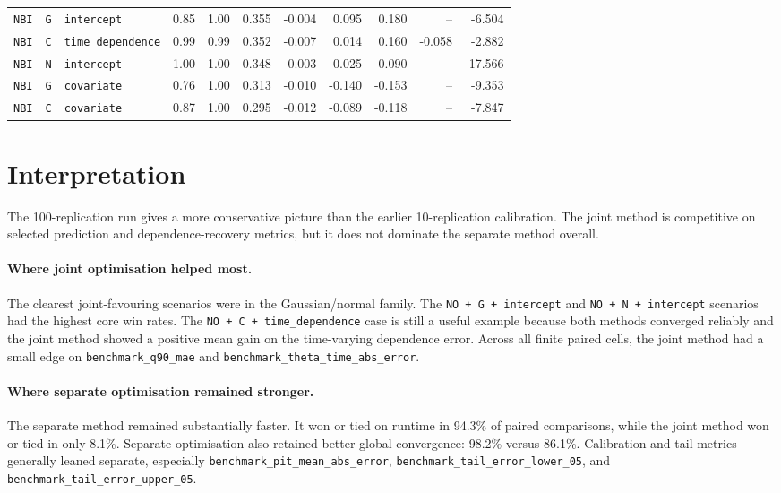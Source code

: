 \documentclass[11pt]{article}
\begin{document}
\begin{landscape}
\begin{longtable}{lllrrrrrrrr}
\texttt{NBI} & \texttt{G} & \texttt{intercept} & 0.85 & 1.00 & 0.355 & -0.004 & 0.095 & 0.180 & -- & -6.504 \\
\texttt{NBI} & \texttt{C} & \texttt{time\_dependence} & 0.99 & 0.99 & 0.352 & -0.007 & 0.014 & 0.160 & -0.058 & -2.882 \\
\texttt{NBI} & \texttt{N} & \texttt{intercept} & 1.00 & 1.00 & 0.348 & 0.003 & 0.025 & 0.090 & -- & -17.566 \\
\texttt{NBI} & \texttt{G} & \texttt{covariate} & 0.76 & 1.00 & 0.313 & -0.010 & -0.140 & -0.153 & -- & -9.353 \\
\texttt{NBI} & \texttt{C} & \texttt{covariate} & 0.87 & 1.00 & 0.295 & -0.012 & -0.089 & -0.118 & -- & -7.847 \\
\bottomrule
\end{longtable}
\end{landscape}

\section{Interpretation}

The 100-replication run gives a more conservative picture than the earlier
10-replication calibration.  The joint method is competitive on selected
prediction and dependence-recovery metrics, but it does not dominate the
separate method overall.

\paragraph{Where joint optimisation helped most.}
The clearest joint-favouring scenarios were in the Gaussian/normal family.  The
\texttt{NO + G + intercept} and \texttt{NO + N + intercept} scenarios had the
highest core win rates.  The \texttt{NO + C + time\_dependence} case is still a
useful example because both methods converged reliably and the joint method
showed a positive mean gain on the time-varying dependence error.  Across all
finite paired cells, the joint method had a small edge on
\texttt{benchmark\_q90\_mae} and \texttt{benchmark\_theta\_time\_abs\_error}.

\paragraph{Where separate optimisation remained stronger.}
The separate method remained substantially faster.  It won or tied on runtime
in 94.3\% of paired comparisons, while the joint method won or tied in only
8.1\%.  Separate optimisation also retained better global convergence:
98.2\% versus 86.1\%.  Calibration and tail metrics generally leaned separate,
especially \texttt{benchmark\_pit\_mean\_abs\_error},
\texttt{benchmark\_tail\_error\_lower\_05}, and
\texttt{benchmark\_tail\_error\_upper\_05}.
\end{document}

